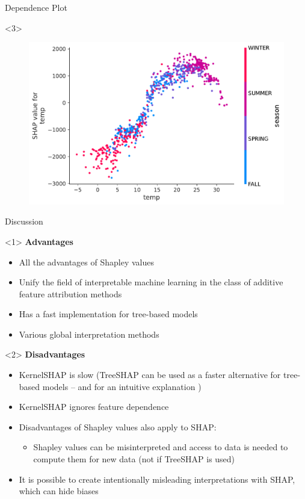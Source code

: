 \documentclass[11pt,compress,t,notes=noshow, aspectratio=169, xcolor=table]{beamer}
\begin{document}
\begin{frame}{Dependence Plot}
\begin{onlyenv}<3>
\begin{figure}
    \centering
    \includegraphics[width=0.5\columnwidth]{figure_man/global_shap_depend_season.pdf}
\end{figure}
\end{onlyenv}
\end{frame}

\begin{frame}{Discussion}
\begin{onlyenv}<1>
\textbf{Advantages}

\begin{itemize}
    \item All the advantages of Shapley values
    \item Unify the field of interpretable machine learning in the class of additive feature attribution methods
    \item Has a fast implementation for tree-based models
    \item Various global interpretation methods
\end{itemize}
\end{onlyenv}

\begin{onlyenv}<2>
\textbf{Disadvantages}

\begin{itemize}
    \item KernelSHAP is slow (TreeSHAP can be used as a faster alternative for tree-based models  -- and for an intuitive explanation  )
    \item KernelSHAP ignores feature dependence
    \item Disadvantages of Shapley values also apply to SHAP:
    \begin{itemize}
        \item Shapley values can be misinterpreted and access to data is needed to compute them for new data (not if TreeSHAP is used)
    \end{itemize}
    \item It is possible to create intentionally misleading interpretations with SHAP, which can hide biases 
\end{itemize}


\end{onlyenv}

\end{frame}

\endlecture
\end{document}
